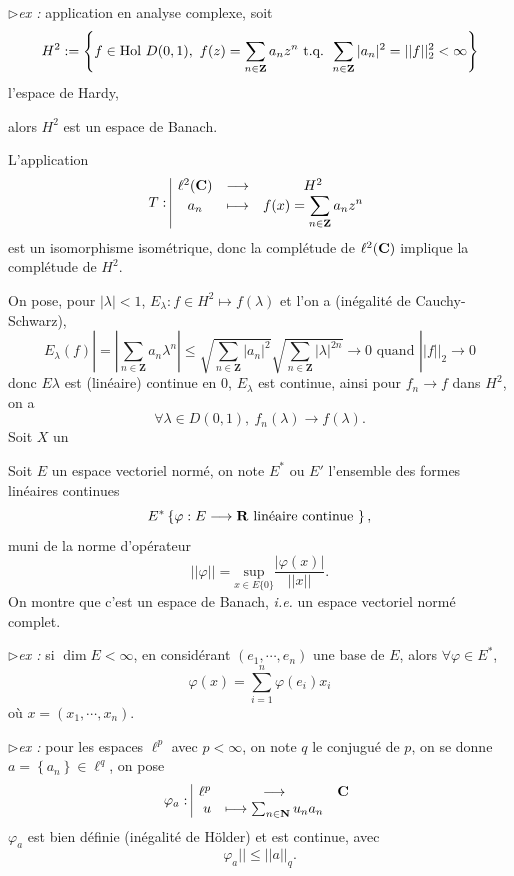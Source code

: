 \documentclass[a4paper,11pt, twoside]{article}
\begin{document}
$\triangleright$\emph{ex :} application en analyse complexe, soit 
$$H^2:=\left\{f\in\mathrm{Hol}\ D(0,1),\ f(z)=\sum_{n\in\mathbf Z}a_n z^n \tq \sum_{n\in\mathbf Z}|a_n|^2=||f||_2^2<\infty\right\}$$
l'espace de Hardy,

alors $H^2$ est un espace de Banach.


\begin{Proof}
  L'application
  $$T:\begin{array}{|ccc}
    \ell^2(\mathbf C)&\longrightarrow&H^2\\
     a_n&\longmapsto&f(x)=\displaystyle\sum_{n\in\mathbf Z}a_n z^n
  \end{array}$$
  est un isomorphisme isométrique, donc la complétude de $ \ell^2(\mathbf C)$ implique la complétude de $H^2$.

  On pose, pour $|\lambda|<1$, $E_\lambda:f\in H^2\longmapsto f(\lambda)$ et l'on a (inégalité de Cauchy-Schwarz),
  $$E_{\lambda}(f)|=\left|\sum_{n\in\mathbf Z}a_n\lambda^n\right|\leqslant \sqrt{\sum_{n\in\mathbf Z}|a_n|^2}\sqrt{\sum_{n\in\mathbf Z}|\lambda|^{2n}}\longrightarrow 0\text{ quand }||f||_2\to 0$$
  donc $E\lambda$ est (linéaire) continue en 0, $E_\lambda$ est continue, ainsi pour $f_n\to f$ dans $H^2$, on a 
  $$\forall \lambda\in D(0,1),\ f_n(\lambda)\longrightarrow f(\lambda).$$
  Soit $X$ un 
\end{Proof}



Soit $E$ un espace vectoriel normé, on note $E^*$ ou $E'$ l'ensemble des formes linéaires continues
$$E^*\left\{\varphi:E\longrightarrow \mathbf R\text{ linéaire continue }\right\},$$ 
muni de la norme d'opérateur 
$$||\varphi||=\underset{x\in E\{0\}}{\mathrm{sup}}\frac{|\varphi(x)|}{||x||}.$$
On montre que c'est un espace de Banach, \emph{i.e.} un espace vectoriel normé complet.

$\triangleright$\emph{ex : }si $\dim E<\infty$, en considérant $(e_1,\cdots, e_n)$ une base de $E$, alors $\forall \varphi\in E^*$,
$$\varphi(x)=\sum_{i=1}^n\varphi(e_i)x_i$$
où $x=(x_1,\cdots,x_n)$.

$\triangleright$\emph{ex : }pour les espaces $\ell^p$ avec $p<\infty$, on note $q$ le conjugué de $p$, on se donne $a=\left\{a_n\right\}\in\ell^q$, on pose 
$$\varphi_a:\begin{array}{|rcl}
  \ell^p&\longrightarrow&\mathbf C\\
  u&\longmapsto\sum_{n\in\mathbf N}u_na_n 
\end{array}$$
$\varphi_a$ est bien définie (inégalité de Hölder) et est continue, avec 
$$\varphi_a||\leqslant ||a||_q.$$
\end{document}
